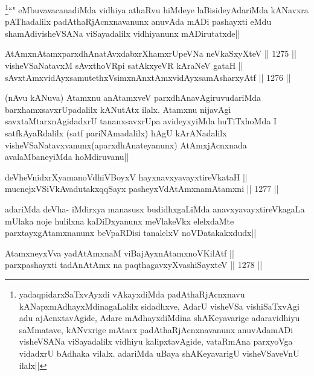 \begin{artha}
\footnote{yadaqpidarxSaTxvAyxdi vAkayxdiMda padAthaRjAcnxnavu kANapxmAdhayxMdinagaLalilx sidadhxve, AdarU visheVSa vishiSaTxvAgi adu ajAcnxtavAgide, Adare mAdhayxdiMdina shAKeyavarige adaravidhiyu saMmatave, kANvxrige mAtarx padAthaRjAcnxnavanunx anuvAdamADi visheVSANa viSayadalilx vidhiyu kalipxtavAgide, vataRmAna parxyoVga vidadxrU bAdhaka vilalx. adariMda uBaya shAKeyavarigU visheVSaveVnU ilalx||}``\stext" eMbuvavacanadiMda vidhiya athaRvu hiMdeye laBisideyAdariMda kANavxra pAThadalilx padAthaRjAcnxnavanunx anuvAda mADi pashayxti eMdu shamAdivisheVSANa viSayadalilx vidhiyanunx mADirutatxde||
\end{artha}


\begin{shl}
AtAmx\s nAtamxparxdhAnatAvxdabxrXhamxrUpeVNa neVkaSxyXteV ||  1275 ||  \\
visheVSaNatavxM sAvxthoVR\s pi satAkxyeVR kAraNeV gataH || \\
sAvxtAmxvidAyxsamutethxV\s simxnAnxtAmxvidAyxsamAsharxyAtf ||  1276 ||  
\end{shl}

\begin{artha}
(nAvu kANuva) Atamxnu anAtamxveV parxdhAnavAgiruvudariMda barxhamxsavxrUpadalilx kANutAtx ilalx. Atamxnu nijavAgi savxtaMtarxnAgidadxrU tananxsavxrUpa avideyxyiMda huTiTxhoMda I satfkAyaRdalilx (satf pariNAmadalilx) hAgU kArANadalilx visheVSaNatavxvanunx(aparxdhAnateyanunx) AtAmxjAcnxnada avalaMbaneyiMda hoMdiruvanu||
\end{artha}


\begin{shl}
deVheVnidxrXyamanoVdhiVBoyxV hayxnavxyavayxtireVkataH || \\
mucnejxVSiVkAvadutakxqqSayx pasheyxVdAtAmxnamAtamxni ||  1277 ||  
\end{shl}

\begin{artha}
adariMda deVha- iMdirxya manasusx budidhxgaLiMda anavxyavayxtireVkagaLa mUlaka noje hulilxna kaDiDxyanunx meVlakeVkx elelxdaMte parxtayxgAtamxnanunx beVpaRDisi tanalelxV noVDatakakxdudx||
\end{artha}

\begin{shl}
AtamxneyxVva yadA\s \s tAmxnaM viBajAyxnAtamxnoV\s KilAtf || \\
parxpashayxti tadA\s nAtAmx na paqthagavxyXvashiSayxteV ||  1278 ||  
\end{shl}

